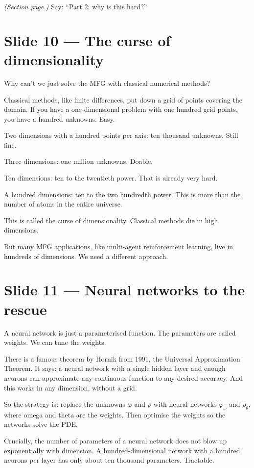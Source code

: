\documentclass[11pt]{article}
\begin{document}
\textit{(Section page.)}  Say: ``Part 2: why is this hard?''

\section*{Slide 10 --- The curse of dimensionality}

Why can't we just solve the MFG with classical numerical methods?

Classical methods, like finite differences, put down a grid of points
covering the domain. If you have a one-dimensional problem with one hundred
grid points, you have a hundred unknowns. Easy.

Two dimensions with a hundred points per axis: ten thousand unknowns. Still
fine.

Three dimensions: one million unknowns. Doable.

Ten dimensions: ten to the twentieth power. That is already very hard.

A hundred dimensions: ten to the two hundredth power. This is more than the
number of atoms in the entire universe.

This is called the curse of dimensionality. Classical methods die in high
dimensions.

But many MFG applications, like multi-agent reinforcement learning, live in
hundreds of dimensions. We need a different approach.

\section*{Slide 11 --- Neural networks to the rescue}

A neural network is just a parameterised function. The parameters are
called weights. We can tune the weights.

There is a famous theorem by Hornik from 1991, the Universal Approximation
Theorem. It says: a neural network with a single hidden layer and enough
neurons can approximate any continuous function to any desired accuracy. And
this works in any dimension, without a grid.

So the strategy is: replace the unknowns $\varphi$ and $\rho$ with neural
networks $\varphi_\omega$ and $\rho_\theta$, where omega and theta are the
weights. Then optimise the weights so the networks solve the PDE.

Crucially, the number of parameters of a neural network does not blow up
exponentially with dimension. A hundred-dimensional network with a hundred
neurons per layer has only about ten thousand parameters. Tractable.
\end{document}

